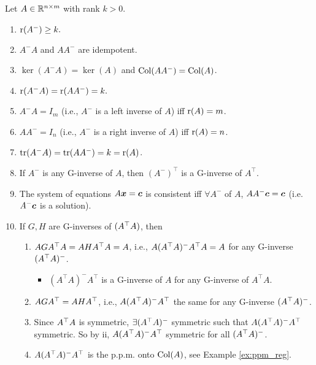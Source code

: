 \documentclass[10pt,a4paper]{book}
\begin{document}
\begin{thmbox}
	\begin{theorem}\label{thm:gen_inv}
		Let $A\in\mathbb R^{n\times m}$ with rank $k>0$.
			\begin{enumerate}
				\item $\mathrm{r}( A^- ) \geq k.$
				\item $A^-A$ and $AA^-$ are idempotent.
				\item $\ker(A^- A)=\ker(A)$ and $\mathrm{Col}(AA^-)=\mathrm{Col}(A)$. 
				\item $\mathrm{r}( A^- A) = \mathrm{r}( AA^- ) = k.$
				\item $A^- A= I_m$ (i.e., $A^-$ is a left inverse of $A$) iff $\mathrm{r}(A)=m$.  
				\item $AA^-=I_n$ (i.e., $A^-$ is a right inverse of $A$) iff $\mathrm{r}(A)=n$.
				\item $\mathrm{tr}(A^-A)=\mathrm{tr}(AA^-)=k=\mathrm{r}(A)$.
				\item If $A^-$ is any G-inverse of $A$, then $(A^-)^\top$ is a G-inverse of $A^\top$.
				\item The system of equations $A{\boldsymbol x}={\boldsymbol c}$ is consistent iff $\forall A^-$ of $A$, $AA^-{\boldsymbol c}={\boldsymbol c}$ (i.e. $A^-{\boldsymbol c}$ is a solution).    
				\item If $G,H$ are G-inverses of $(A^\top A)$, then 
				\begin{enumerate}
					\item $AGA^\top A=AHA^\top A=A$, i.e., $A(A^\top A)^{-}A^\top A=A$ for any G-inverse $(A^\top A)^{-}$.
					\begin{itemize}
						\item $(A^\top A)^-A^\top$ is a G-inverse of $A$ for any G-inverse of $A^\top A.$
					\end{itemize}
					\item $AGA^\top=AHA^\top$, i.e., $A(A^\top A)^{-}A^\top$ the same for any G-inverse $(A^\top A)^{-}$.
					\item Since $A^\top A$ is symmetric, $\exists (A^\top A)^{-}$ symmetric such that $A(A^\top A)^{-}A^\top$ symmetric. So by ii, $A(A^\top A)^{-}A^\top$ symmetric for all $(A^\top A)^{-}$.      
					\item $A(A^\top A)^{-}A^\top$ is the p.p.m. onto $\mathrm{Col}(A)$, see Example \ref{ex:ppm_reg}. 
				\end{enumerate}  
			\end{enumerate}
	\end{theorem}
\end{thmbox}
\end{document}
